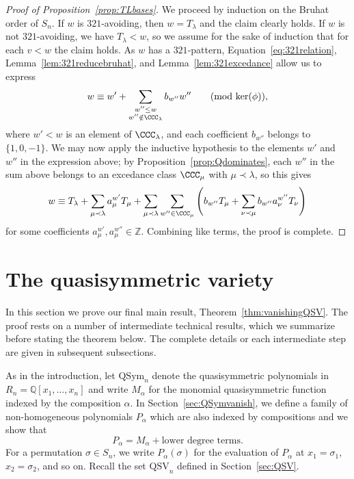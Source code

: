 \documentclass[12pt]{amsart}
\theoremstyle{definition}
\theoremstyle{remark}
\numberwithin{equation}{section}
\newcommand{\QQ}{\mathbb{Q}}
\newcommand{\ZZ}{\mathbb{Z}}
\newcommand{\QSym}{\mathrm{QSym}}
\newcommand{\QSV}{\mathrm{QSV}}
\begin{document}
\begin{proof}[Proof of Proposition~\ref{prop:TLbases}]
We proceed by induction on the Bruhat order of $S_{n}$.  If $w$ is $321$-avoiding, then $w = T_{\lambda}$ and the claim clearly holds.  
If $w$ is not $321$-avoiding, we have $T_{\lambda} < w$, so we assume for the sake of induction that for each $v < w$ the claim holds.  
As $w$ has a $321$-pattern, Equation~\eqref{eq:321relation}, Lemma~\ref{lem:321reducebruhat}, and Lemma~\ref{lem:321excedance} allow us to express
\[
w \equiv w' + \sum_{\substack{w'' \le w \\ w'' \notin \CCC_{\lambda} }} b_{w''} w'' \qquad \text{(mod $\ker(\phi)$)},
\]
where $w' < w$ is an element of $\CCC_{\lambda}$, and each coefficient $b_{w''}$ belongs to $\{1, 0, -1\}$.  
We may now apply the inductive hypothesis to the elements $w'$ and $w''$ in the expression above; by Proposition~\ref{prop:Qdominates}, each $w''$ in the sum above belongs to an excedance class $\CCC_{\mu}$ with $\mu \prec \lambda$, so this gives
\[
w \equiv T_{\lambda} + \sum_{\mu \prec \lambda} a_{\mu}^{w'} T_{\mu} + \sum_{\mu \prec \lambda} \sum_{w'' \in \CCC_{\mu}} \left( b_{w''} T_{\mu} + \sum_{\nu \prec \mu} b_{w''} a_{\nu}^{w''} T_{\nu}\right)
\]
for some coefficients $a_{\mu}^{w'}, a_{\mu}^{w''} \in \ZZ$.  Combining like terms, the proof is complete.
\end{proof}


\section{The quasisymmetric variety}
\label{sec:vanishingtheorems}

In this section we prove our final main result, Theorem~\ref{thm:vanishingQSV}.  
The proof rests on a number of intermediate technical results, which we summarize before stating the theorem below.  
The complete details or each intermediate step are given in subsequent subsections.

As in the introduction, let $\QSym_{n}$ denote the quasisymmetric polynomials in $R_{n} = \QQ[x_{1}, \ldots, x_{n}]$ and write $M_{\alpha}$ for the monomial quasisymmetric function indexed by the composition $\alpha$.  In Section~\ref{sec:QSymvanish}, we define a family of non-homogeneous polynomials $P_{\alpha}$ which are also indexed by compositions and we show that
\begin{equation}
\label{eq:Palphahomogeneous}
P_{\alpha} = M_{\alpha} + \text{lower degree terms}.
\end{equation}
For a permutation $\sigma \in S_{n}$, we write $P_{\alpha}(\sigma)$ for the evaluation of $P_{\alpha}$ at $x_{1} = \sigma_{1}$, $x_{2} = \sigma_{2}$, and so on.  Recall the set $\QSV_{n}$ defined in Section~\ref{sec:QSV}.
\end{document}
